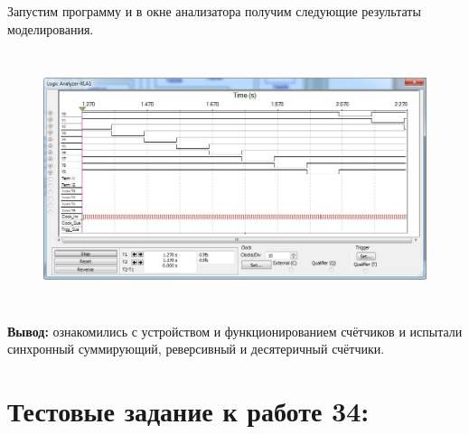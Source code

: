 \documentclass[spec, och, labwork]{shiza}
\begin{document}
Запустим программу и в окне анализатора получим следующие результаты
моделирования.

\begin{figure}[H]
    \centering
    \includegraphics[width=5.56253in,height=2.94697in]{image13.jpeg}
\end{figure}

\textbf{Вывод:} ознакомились с устройством и функционированием счётчиков
и испытали синхронный суммирующий, реверсивный и десятеричный счётчики.


\section*{Тестовые задание к работе 34:}
\end{document}
